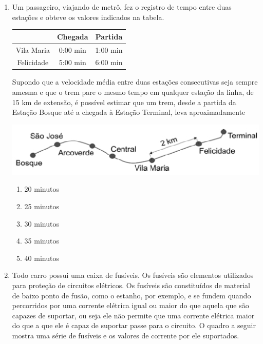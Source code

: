 \documentclass[10pt,a4paper]{article}
\newenvironment{Figure}
  {\par\medskip\noindent\minipage{\linewidth}}
  {\endminipage\par\medskip}
\begin{document}
\begin{multicols}{2}
\begin{enumerate}
	\item Um passageiro, viajando de metr\^o, fez o registro de tempo entre duas esta\c{c}\~oes e obteve os valores indicados na tabela. \\


	\begin{Figure}  %
	\begin{tabular}{|c|c|c|} %
	\hline
	& Chegada  & Partida \tabularnewline
	
	\hline
	 Vila Maria & 0:00 min & 1:00 min \tabularnewline

	\hline
	  Felicidade & 5:00 min & 6:00 min \tabularnewline
	\hline
	\end{tabular}
	\end{Figure}

	Supondo que a velocidade m\'edia entre duas esta\c{c}\~oes consecutivas seja sempre amesma e que o trem pare o mesmo tempo em qualquer esta\c{c}\~ao da linha, de 15 km de extens\~ao, \'e poss\'ivel estimar que um trem, desde a partida da Esta\c{c}\~ao Bosque at\'e a chegada \`a Esta\c{c}\~ao Terminal, leva aproximadamente
	

\begin{Figure}
     \includegraphics[width=\linewidth]{cidades_fisica.jpg}
\end{Figure}

		\begin{enumerate}
		\item 20 minutos
		\item 25 minutos
		\item 30 minutos
		\item 35 minutos
		\item 40 minutos
		\end{enumerate}


	\item Todo carro possui uma caixa de fus\'iveis. Os fus\'iveis s\~ao elementos utilizados para prote\c{c}\~ao de circuitos el\'etricos. Os fus\'iveis s\~ao constitu\'idos de material de baixo ponto de fus\~ao, como o estanho, por exemplo, e se fundem quando percorridos por uma corrente el\'etrica igual ou maior do que aquela que s\~ao capazes de suportar, ou seja ele n\~ao permite que uma corrente el\'etrica maior do que a que ele \'e capaz de suportar passe para o circuito.  O quadro a seguir mostra uma s\'erie de fus\'iveis e os valores de corrente por ele suportados.


\end{enumerate}
\end{multicols}
\end{document}
